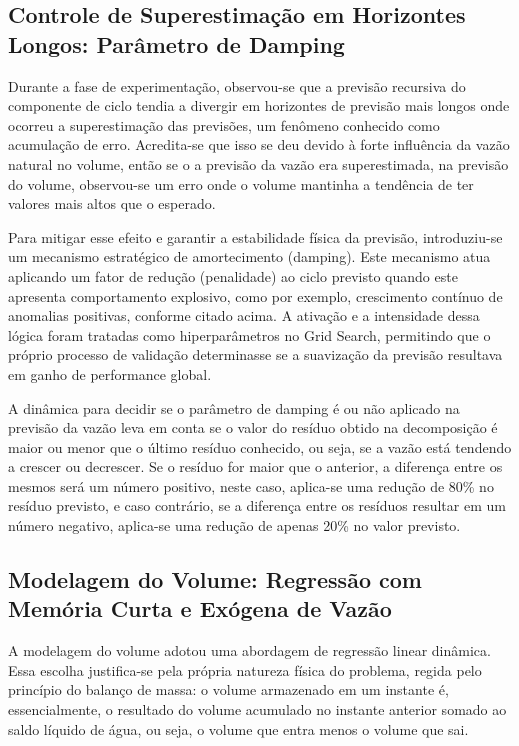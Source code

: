 \subsection{Controle de Superestimação em Horizontes Longos: Parâmetro de Damping}

Durante a fase de experimentação, observou-se que a previsão recursiva do componente de ciclo tendia a divergir em horizontes de previsão mais longos onde ocorreu a superestimação das previsões, um fenômeno conhecido como acumulação de erro. Acredita-se que isso se deu devido à forte influência da vazão natural no volume, então se o a previsão da vazão era superestimada, na previsão do volume, observou-se um erro onde o volume mantinha a tendência de ter valores mais altos que o esperado.

Para mitigar esse efeito e garantir a estabilidade física da previsão, introduziu-se um mecanismo estratégico de amortecimento (damping). Este mecanismo atua aplicando um fator de redução (penalidade) ao ciclo previsto quando este apresenta comportamento explosivo, como por exemplo, crescimento contínuo de anomalias positivas, conforme citado acima. A ativação e a intensidade dessa lógica foram tratadas como hiperparâmetros no Grid Search, permitindo que o próprio processo de validação determinasse se a suavização da previsão resultava em ganho de performance global.

A dinâmica para decidir se o parâmetro de damping é ou não aplicado na previsão da vazão leva em conta se o valor do resíduo obtido na decomposição é maior ou menor que o último resíduo conhecido, ou seja, se a vazão está tendendo a crescer ou decrescer. Se o resíduo for maior que o anterior, a diferença entre os mesmos será um número positivo, neste caso, aplica-se uma redução de 80\% no resíduo previsto, e caso contrário, se a diferença entre os resíduos resultar em um número negativo, aplica-se uma redução de apenas 20\% no valor previsto.

\subsection{Modelagem do Volume: Regressão com Memória Curta e Exógena de Vazão}

A modelagem do volume adotou uma abordagem de regressão linear dinâmica. Essa escolha justifica-se pela própria natureza física do problema, regida pelo princípio do balanço de massa: o volume armazenado em um instante é, essencialmente, o resultado do volume acumulado no instante anterior somado ao saldo líquido de água, ou seja, o volume que entra menos o volume que sai.

